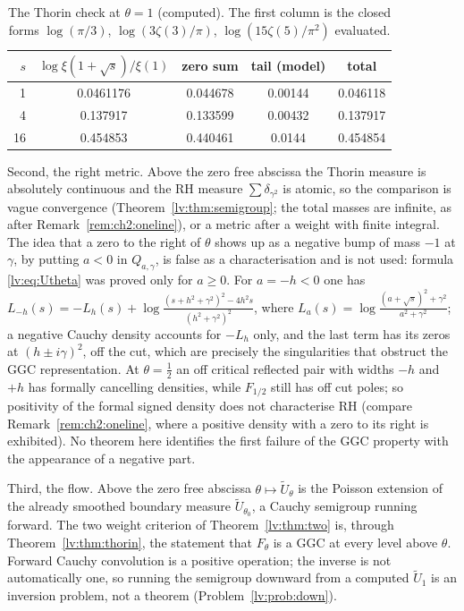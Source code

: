 \begin{table}[h]\centering\footnotesize
\begin{tabular}{rcccc}
\toprule
$s$ & $\log\xi(1+\sqrt s)/\xi(1)$ & zero sum & tail (model) & total\\
\midrule
1 & 0.0461176 & 0.044678 & 0.00144 & 0.046118\\
4 & 0.137917 & 0.133599 & 0.00432 & 0.137917\\
16 & 0.454853 & 0.440461 & 0.0144 & 0.454854\\
\bottomrule
\end{tabular}
\caption{The Thorin check at $\theta=1$ (computed). The first column is the closed forms $\log(\pi/3)$, $\log(3\zeta(3)/\pi)$, $\log(15\zeta(5)/\pi^2)$ evaluated.}\label{lv:tab:thorin}
\end{table}

Second, the right metric. Above the zero free abscissa the Thorin measure is absolutely continuous and the RH measure $\sum\delta_{\gamma^2}$ is atomic, so the comparison is vague convergence (Theorem~\ref{lv:thm:semigroup}; the total masses are infinite, as after Remark~\ref{rem:ch2:oneline}), or a metric after a weight with finite integral. The idea that a zero to the right of $\theta$ shows up as a negative bump of mass $-1$ at $\gamma$, by putting $a<0$ in $Q_{a,\gamma}$, is false as a characterisation and is not used: formula \eqref{lv:eq:Utheta} was proved only for $a\ge0$. For $a=-h<0$ one has $L_{-h}(s)=-L_h(s)+\log\frac{(s+h^2+\gamma^2)^2-4h^2s}{(h^2+\gamma^2)^2}$, where $L_a(s)=\log\frac{(a+\sqrt s)^2+\gamma^2}{a^2+\gamma^2}$; a negative Cauchy density accounts for $-L_h$ only, and the last term has its zeros at $(h\pm i\gamma)^2$, off the cut, which are precisely the singularities that obstruct the GGC representation. At $\theta=\frac12$ an off critical reflected pair with widths $-h$ and $+h$ has formally cancelling densities, while $F_{1/2}$ still has off cut poles; so positivity of the formal signed density does not characterise RH (compare Remark~\ref{rem:ch2:oneline}, where a positive density with a zero to its right is exhibited). No theorem here identifies the first failure of the GGC property with the appearance of a negative part.

Third, the flow. Above the zero free abscissa $\theta\mapsto\widetilde U_\theta$ is the Poisson extension of the already smoothed boundary measure $\widetilde U_{\theta_0}$, a Cauchy semigroup running forward. The two weight criterion of Theorem~\ref{lv:thm:two} is, through Theorem~\ref{lv:thm:thorin}, the statement that $F_\theta$ is a GGC at every level above $\theta$. Forward Cauchy convolution is a positive operation; the inverse is not automatically one, so running the semigroup downward from a computed $\widetilde U_1$ is an inversion problem, not a theorem (Problem~\ref{lv:prob:down}).

